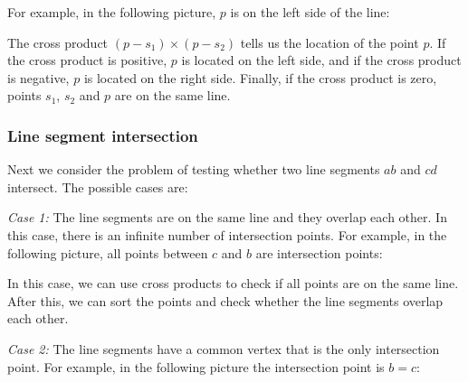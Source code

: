 For example, in the following picture,
$p$ is on the left side of the line:
\begin{center}
\end{center}

The cross product $(p-s_1) \times (p-s_2)$
tells us the location of the point $p$.
If the cross product is positive,
$p$ is located on the left side,
and if the cross product is negative,
$p$ is located on the right side.
Finally, if the cross product is zero,
points $s_1$, $s_2$ and $p$ are on the same line.

\subsubsection{Line segment intersection}


Next we consider the problem of testing
whether two line segments
$ab$ and $cd$ intersect. The possible cases are:

\textit{Case 1:}
The line segments are on the same line
and they overlap each other.
In this case, there is an infinite number of
intersection points.
For example, in the following picture,
all points between $c$ and $b$ are
intersection points:
\begin{center}
\end{center}

In this case, we can use cross products to
check if all points are on the same line.
After this, we can sort the points and check
whether the line segments overlap each other.

\textit{Case 2:}
The line segments have a common vertex
that is the only intersection point.
For example, in the following picture the
intersection point is $b=c$:

